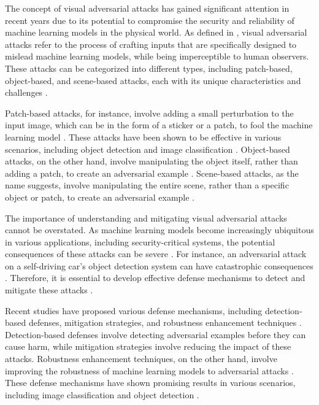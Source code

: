 \documentclass[11pt,a4paper]{article}
\begin{document}
The concept of visual adversarial attacks has gained significant attention in recent years due to its potential to compromise the security and reliability of machine learning models in the physical world. As defined in \cite{doi:10.1145/3128572.3140444}, visual adversarial attacks refer to the process of crafting inputs that are specifically designed to mislead machine learning models, while being imperceptible to human observers. These attacks can be categorized into different types, including patch-based, object-based, and scene-based attacks, each with its unique characteristics and challenges \cite{arxiv:1707.08945}.

Patch-based attacks, for instance, involve adding a small perturbation to the input image, which can be in the form of a sticker or a patch, to fool the machine learning model \cite{arxiv:1712.09665}. These attacks have been shown to be effective in various scenarios, including object detection and image classification \cite{arxiv:1906.11897}. Object-based attacks, on the other hand, involve manipulating the object itself, rather than adding a patch, to create an adversarial example \cite{arxiv:1807.07769}. Scene-based attacks, as the name suggests, involve manipulating the entire scene, rather than a specific object or patch, to create an adversarial example \cite{doi:10.24963/ijcai.2021/694}.

The importance of understanding and mitigating visual adversarial attacks cannot be overstated. As machine learning models become increasingly ubiquitous in various applications, including security-critical systems, the potential consequences of these attacks can be severe \cite{doi:10.1109/access.2018.2807385}. For instance, an adversarial attack on a self-driving car's object detection system can have catastrophic consequences \cite{doi:10.1007/978-3-030-10925-7_4}. Therefore, it is essential to develop effective defense mechanisms to detect and mitigate these attacks \cite{arxiv:1810.00069}.

Recent studies have proposed various defense mechanisms, including detection-based defenses, mitigation strategies, and robustness enhancement techniques \cite{doi:10.1049/cit2.12028}. Detection-based defenses involve detecting adversarial examples before they can cause harm, while mitigation strategies involve reducing the impact of these attacks. Robustness enhancement techniques, on the other hand, involve improving the robustness of machine learning models to adversarial attacks \cite{arxiv:2003.06693}. These defense mechanisms have shown promising results in various scenarios, including image classification and object detection \cite{doi:10.1016/j.cose.2020.102092}.
\end{document}
